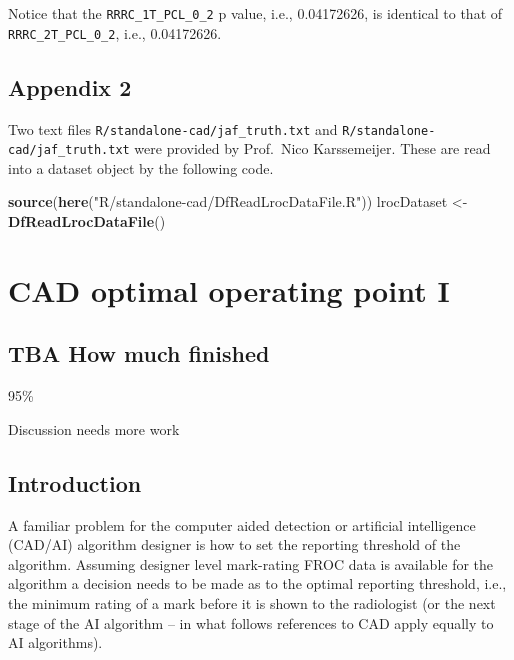 \documentclass[
]{book}
\newenvironment{Shaded}{\begin{snugshade}}{\end{snugshade}}
\newcommand{\KeywordTok}[1]{\textcolor[rgb]{0.13,0.29,0.53}{\textbf{#1}}}
\newcommand{\NormalTok}[1]{#1}
\newcommand{\StringTok}[1]{\textcolor[rgb]{0.31,0.60,0.02}{#1}}
\begin{document}
Notice that the \texttt{RRRC\_1T\_PCL\_0\_2} p value, i.e., 0.04172626, is identical to that of \texttt{RRRC\_2T\_PCL\_0\_2}, i.e., 0.04172626.

\hypertarget{standalone-cad-radiologists-appendix2}{%
\section{Appendix 2}\label{standalone-cad-radiologists-appendix2}}

Two text files \texttt{R/standalone-cad/jaf\_truth.txt} and \texttt{R/standalone-cad/jaf\_truth.txt} were provided by Prof.~Nico Karssemeijer. These are read into a dataset object by the following code.

\begin{Shaded}
\begin{Highlighting}[]
\KeywordTok{source}\NormalTok{(}\KeywordTok{here}\NormalTok{(}\StringTok{"R/standalone-cad/DfReadLrocDataFile.R"}\NormalTok{))}
\NormalTok{lrocDataset <-}\StringTok{ }\KeywordTok{DfReadLrocDataFile}\NormalTok{()}
\end{Highlighting}
\end{Shaded}

\hypertarget{optim-op-point}{%
\chapter{CAD optimal operating point I}\label{optim-op-point}}

\hypertarget{optim-op-point-how-much-finished}{%
\section{TBA How much finished}\label{optim-op-point-how-much-finished}}

95\%

Discussion needs more work

\hypertarget{optim-op-point-intro}{%
\section{Introduction}\label{optim-op-point-intro}}

A familiar problem for the computer aided detection or artificial intelligence (CAD/AI) algorithm designer is how to set the reporting threshold of the algorithm. Assuming designer level mark-rating FROC data is available for the algorithm a decision needs to be made as to the optimal reporting threshold, i.e., the minimum rating of a mark before it is shown to the radiologist (or the next stage of the AI algorithm -- in what follows references to CAD apply equally to AI algorithms).
\end{document}
